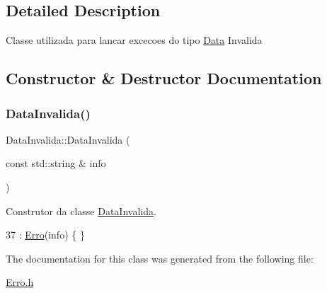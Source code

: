 \subsection{Detailed Description}
Classe utilizada para lancar excecoes do tipo \hyperlink{classData}{Data} Invalida 

\subsection{Constructor \& Destructor Documentation}
\mbox{\label{classDataInvalida_af024b53b8f0ba3c388a6283df30d7123}} 
\subsubsection{\texorpdfstring{Data\+Invalida()}{DataInvalida()}}
{\footnotesize\ttfamily Data\+Invalida\+::\+Data\+Invalida (\begin{DoxyParamCaption}\item[{const std\+::string \&}]{info }\end{DoxyParamCaption})\hspace{0.3cm}{\ttfamily [inline]}}



Construtor da classe \hyperlink{classDataInvalida}{Data\+Invalida}. 


\begin{DoxyCode}
37 : \hyperlink{classErro_a15d79796bd17517ff05d45eee55556f1}{Erro}(info) \{ \}
\end{DoxyCode}


The documentation for this class was generated from the following file\+:\begin{DoxyCompactItemize}
\item 
\hyperlink{Erro_8h}{Erro.\+h}\end{DoxyCompactItemize}
